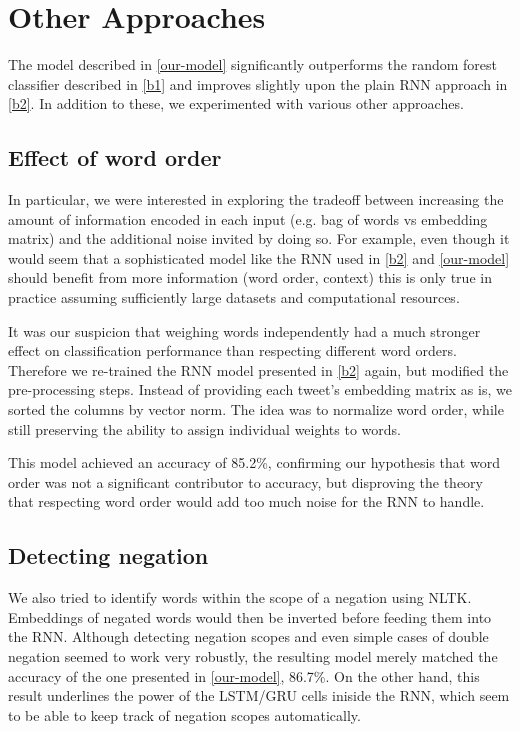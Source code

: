 \documentclass[10pt,conference,compsocconf]{IEEEtran}
\begin{document}
\section*{Other Approaches}

The model described in \autoref{our-model} significantly outperforms
the random forest classifier described in \autoref{b1} and improves
slightly upon the plain RNN approach in \autoref{b2}. In addition to
these, we experimented with various other approaches.

\subsection*{Effect of word order}

In particular, we were interested in exploring the tradeoff between
increasing the amount of information encoded in each input (e.g. bag
of words vs embedding matrix) and the additional noise invited by
doing so. For example, even though it would seem that a sophisticated
model like the RNN used in \autoref{b2} and \autoref{our-model} should
benefit from more information (word order, context) this is only true
in practice assuming sufficiently large datasets and computational
resources.

It was our suspicion that weighing words independently had a much
stronger effect on classification performance than respecting
different word orders. Therefore we re-trained the RNN model presented
in \autoref{b2} again, but modified the pre-processing steps. Instead
of providing each tweet's embedding matrix as is, we sorted the
columns by vector norm. The idea was to normalize word order, while
still preserving the ability to assign individual weights to
words.

This model achieved an accuracy of 85.2\%, confirming our hypothesis
that word order was not a significant contributor to accuracy, but
disproving the theory that respecting word order would add too much
noise for the RNN to handle.

\subsection*{Detecting negation}

We also tried to identify words within the scope of a negation using
NLTK. Embeddings of negated words would then be inverted before
feeding them into the RNN. Although detecting negation scopes and even
simple cases of double negation seemed to work very robustly, the
resulting model merely matched the accuracy of the one presented in
\autoref{our-model}, 86.7\%. On the other hand, this result underlines
the power of the LSTM/GRU cells iniside the RNN, which seem to be able
to keep track of negation scopes automatically.
\end{document}
